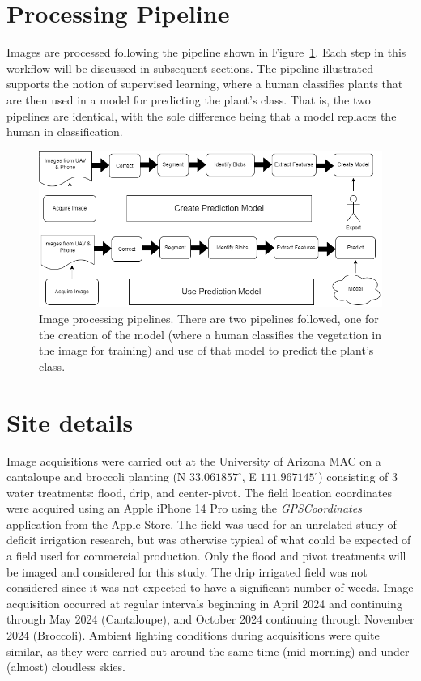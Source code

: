 \documentclass[letterpaper]{report}
\begin{document}
\section{Processing Pipeline}
Images are processed following the pipeline shown in Figure~\ref{fig:workflow}. Each step in this workflow will be discussed in subsequent sections. The pipeline illustrated supports the notion of supervised learning, where a human classifies plants that are then used in a model for predicting the plant's class. That is, the two pipelines are identical, with the sole difference being that a model replaces the human in classification. 
\begin{figure}[H]
	\centering
	\includegraphics[width=0.85\linewidth]{./figures/workflow.png}
	\caption[Image processing workflow]{Image processing pipelines. There are two pipelines followed, one for the creation of the model (where a human classifies the vegetation in the image for training) and use of that model to predict the plant's class.}
	\label{fig:workflow}	
\end{figure}

\section{Site details}
Image acquisitions were carried out at the University of Arizona \gls{MAC} on a cantaloupe and broccoli planting (N $33.061857^\circ$, E $111.967145^\circ$) consisting of 3 water treatments: flood, drip, and center-pivot. The field location coordinates were acquired using an Apple iPhone 14 Pro using the \textit{GPSCoordinates} application from the Apple Store. The field was used for an unrelated study of deficit irrigation research, but was otherwise typical of what could be expected of a field used for commercial production.
Only the flood and pivot treatments will be imaged and considered for this study. The drip irrigated field was not considered since it was not expected to have a significant number of weeds.  Image acquisition occurred at regular intervals beginning in April 2024 and continuing through May 2024 (Cantaloupe), and October 2024 continuing through November 2024 (Broccoli).  Ambient lighting conditions during acquisitions were quite similar, as they were carried out around the same time (mid-morning) and under (almost) cloudless skies.
\end{document}
